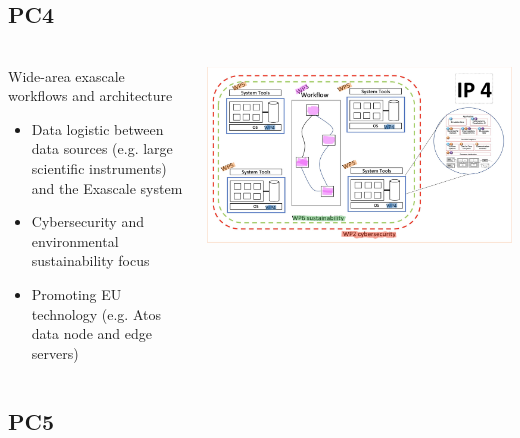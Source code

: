 \subsection{PC4}

\begin{frame}
  \frametitle{\insertsectionhead}
  \framesubtitle{\insertsubsectionhead}

  \begin{columns}
    \begin{column}{0.5\textwidth}
      \begin{alertblock}{Wide-area exascale workflows and
        architecture}
        \begin{itemize}
          \item Data logistic between data sources
          (e.g. large scientific instruments) and
          the Exascale system
          \item Cybersecurity and environmental
          sustainability focus
          \item Promoting EU technology (e.g. Atos
          data node and edge servers)
        \end{itemize}
      \end{alertblock}
      
    \end{column}
    \begin{column}{.5\textwidth}
      \includegraphics[width=\textwidth]{../figures/numpex-ip4.png}
    \end{column}
  \end{columns}

\end{frame}


\subsection{PC5}

